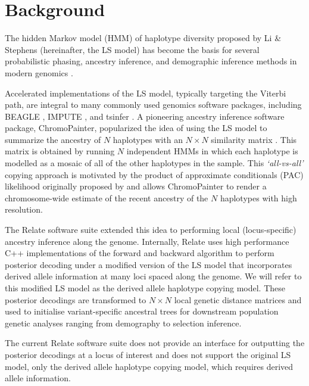 \documentclass[pdflatex,referee,lineno,sn-nature]{sn-jnl}%
\begin{document}
\maketitle

\section*{Background}
\label{introduction}

The hidden Markov model (HMM) of haplotype diversity proposed by Li \& Stephens \cite{Li2213} (hereinafter, the LS model) has become the basis for several probabilistic phasing, ancestry inference, and demographic inference methods in modern genomics \cite{speidel,Song1005}.

Accelerated implementations of the LS model, typically targeting the Viterbi path, are integral to many commonly used genomics software packages, including BEAGLE \cite{beagle}, IMPUTE \cite{impute}, and tsinfer \cite{tsinfer}.
A pioneering ancestry inference software package, ChromoPainter, popularized the idea of using the LS model to summarize the ancestry of \(N\) haplotypes with an \(N \times N\) similarity matrix \cite{lawson2012inference}.
This matrix is obtained by running \(N\) independent HMMs in which each haplotype is modelled as a mosaic of all of the other haplotypes in the sample.
This \emph{`all-vs-all'} copying approach is motivated by the product of approximate conditionals (PAC) likelihood originally proposed by \cite{Li2213} and allows ChromoPainter to render a chromosome-wide estimate of the recent ancestry of the \(N\) haplotypes with high resolution.

The Relate \cite{speidel} software suite extended this idea to performing local (locus-specific) ancestry inference along the genome.
Internally, Relate uses high performance C++ implementations of the forward and backward algorithm to perform posterior decoding under a modified version of the LS model that incorporates derived allele information at many loci spaced along the genome.
We will refer to this modified LS model as the derived allele haplotype copying model.
These posterior decodings are transformed to \(N \times N\) local genetic distance matrices and used to initialise variant-specific ancestral trees for downstream population genetic analyses ranging from demography to selection inference.

The current Relate software suite does not provide an interface for outputting the posterior decodings at a locus of interest and does not support the original LS model, only the derived allele haplotype copying model, which requires derived allele information.
\end{document}
